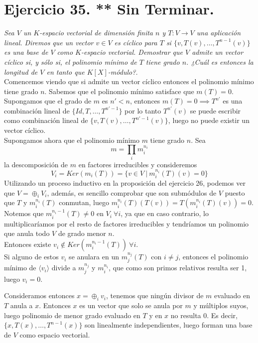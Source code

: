\section{Ejercicio 35. ** Sin Terminar.} \textit{Sea \(V\) un \(K\)-espacio
  vectorial de dimensión finita \(n\) y \(T:V \to V\) una
  aplicación lineal. Diremos que un vector \(v \in V\) es cíclico para
  \(T\) si \(\{v, T(v), \dots, T^{n-1}(v)\}\) es una base de \(V\)
  como \(K\)-espacio vectorial. Demostrar que \(V\) admite un vector cíclico si,
  y sólo si, el polinomio mínimo de \(T\) tiene grado \(n\). ¿Cuál es entonces
  la longitud de \(V\) en tanto que \(K[X]\)-módulo?.}\\


Comencemos viendo que si admite un vector cíclico entonces el polinomio mínimo
tiene grado \(n\). Sabemos que el polinomio mínimo satisface que \(m(T)=0\). Supongamos que el
grado de \(m\) es \(n' < n\),  entonces \(m(T)=0 \implies T^{n'}\) es una
combinación lineal de \(\{Id,T,\dots,T^{n'-1}\}\) por lo tanto \(T^{n'}(v)\) se
puede escribir como combinación lineal de \(\{v,T(v),\dots,T^{n'-1}(v)\}\),
luego no puede existir un vector cíclico.\\

Supongamos ahora que el polinomio mínimo \(m\) tiene grado \(n\). Sea
\[
  m = \prod_i m_i^{n_i}
\]
la descomposición de \(m\) en factores irreducibles y consideremos
\[
  V_i = Ker(m_i(T)) = \{v \in V \ | \ m_i^{n_i}(T)(v) = 0\}
\]
Utilizando un proceso inductivo en la proposición del ejercicio 26, podemos ver
que \(V = \oplus_i V_i\), además, es sencillo comprobar que son submódulos de \(V\) puesto que \(T\) y \(m_i^{n_i}(T)\)
conmutan, luego \(m_i^{n_i}(T)(T(v)) = T(m_i^{n_i}(T)(v)) = 0\).
Notemos que \(m_i^{n_i - 1}(T) \neq 0\) en \(V_i \ \forall i\), ya que en caso
contrario, lo multiplicaríamos por el resto de factores irreducibles y
tendríamos un polinomio que anula todo \(V\) de grado menor \(n\).\\

Entonces existe \(v_i \not \in Ker(m_i^{n_i-1}(T)) \ \forall i\).\\

Si alguno de estos \(v_i\) se anulara en un \(m_j^{n_j}(T)\) con \(i \neq j\),
entonces el polinomio mínimo de \(\langle v_i \rangle\) divide a \(m_j^{n_j}\) y
\(m_i^{n_i}\), que como son primos relativos resulta ser 1, luego \(v_i = 0\).

Consideramos entonces \(x = \oplus_i v_i\), tenemos que ningún divisor de \(m\)
evaluado en \(T\) anula a \(x\). Entonces \(x\) es un vector que solo se anula
por \(m\) y múltiplos suyos, luego polinomio de menor grado evaluado en \(T\) y
en \(x\) no resulta 0. Es decir, \(\{x, T(x), \dots, T^{n-1}(x)\}\)
son linealmente independientes, luego forman una base de \(V\) como espacio
vectorial.
